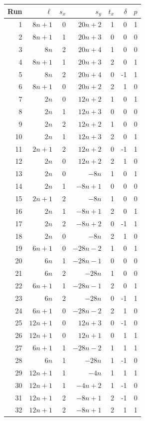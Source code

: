 \documentclass[11pt]{article}
\begin{document}
\begin{longtable}{r r r r r r r}
\toprule
Run & $\ell$ & $s_x$ & $s_y$ & $t_x$ & $\delta$ & $p$\\
\midrule
\endhead
1&$8n+1$&0&$20n+2$&1&0&1\\
2&$8n+1$&1&$20n+3$&0&0&0\\
3&$8n$&2&$20n+4$&1&0&0\\
4&$8n+1$&1&$20n+3$&2&0&1\\
5&$8n$&2&$20n+4$&0&-1&1\\
6&$8n+1$&0&$20n+2$&2&1&0\\
7&$2n$&0&$12n+2$&1&0&1\\
8&$2n$&1&$12n+3$&0&0&0\\
9&$2n$&2&$12n+2$&1&0&0\\
10&$2n$&1&$12n+3$&2&0&1\\
11&$2n+1$&2&$12n+2$&0&-1&1\\
12&$2n$&0&$12n+2$&2&1&0\\
13&$2n$&0&$-8n$&1&0&1\\
14&$2n$&1&$-8n+1$&0&0&0\\
15&$2n+1$&2&$-8n$&1&0&0\\
16&$2n$&1&$-8n+1$&2&0&1\\
17&$2n$&2&$-8n+2$&0&-1&1\\
18&$2n$&0&$-8n$&2&1&0\\
19&$6n+1$&0&$-28n-2$&1&0&1\\
20&$6n$&1&$-28n-1$&0&0&0\\
21&$6n$&2&$-28n$&1&0&0\\
22&$6n+1$&1&$-28n-1$&2&0&1\\
23&$6n$&2&$-28n$&0&-1&1\\
24&$6n+1$&0&$-28n-2$&2&1&0\\
25&$12n+1$&0&$12n+3$&0&-1&0\\
26&$12n+1$&0&$12n+1$&0&1&1\\
27&$6n+1$&1&$-28n-2$&1&1&1\\
28&$6n$&1&$-28n$&1&-1&0\\
29&$12n+1$&1&$-4n$&1&1&1\\
30&$12n+1$&1&$-4n+2$&1&-1&0\\
31&$12n+1$&2&$-8n+1$&2&-1&0\\
32&$12n+1$&2&$-8n+1$&2&1&1\\
\bottomrule
\end{longtable}
\end{document}
